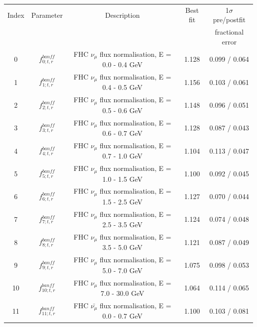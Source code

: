 {
\renewcommand{\arraystretch}{1.2}



\begin{table}
\centering
\begin{tabular}{| c | c | c | c | c |}
\hline
 Index & Parameter             & Description                                                & Best fit & 1$\sigma$ pre/postfit \\
       &                       &                                                            &          & fractional error \\
\hline

0      &$f_{0; t, r}^{banff}$  & FHC $\nu_\mu$ flux normalisation, E = 0.0 - 0.4 GeV         & 1.128   & 0.099 / 0.064 \\  
1      &$f_{1; t, r}^{banff}$  & FHC $\nu_\mu$ flux normalisation, E = 0.4 - 0.5 GeV         & 1.156   & 0.103 / 0.061 \\  
2      & $f_{2; t, r}^{banff}$ & FHC $\nu_\mu$ flux normalisation, E = 0.5 - 0.6 GeV         & 1.148   & 0.096 / 0.051 \\  
3      &$f_{3; t, r}^{banff}$  & FHC $\nu_\mu$ flux normalisation, E = 0.6 - 0.7 GeV         & 1.128   & 0.087 / 0.043 \\  
4      &$f_{4; t, r}^{banff}$  & FHC $\nu_\mu$ flux normalisation, E = 0.7 - 1.0 GeV         & 1.104   & 0.113 / 0.047 \\  
5      & $f_{5; t, r}^{banff}$ & FHC $\nu_\mu$ flux normalisation, E = 1.0 - 1.5 GeV         & 1.100   & 0.092 / 0.045 \\  
6      &$f_{6; t, r}^{banff}$  & FHC $\nu_\mu$ flux normalisation, E = 1.5 - 2.5 GeV         & 1.127   & 0.070 / 0.044 \\  
7      &$f_{7; t, r}^{banff}$  & FHC $\nu_\mu$ flux normalisation, E = 2.5 - 3.5 GeV         & 1.124   & 0.074 / 0.048 \\  
8      &$f_{8; t, r}^{banff}$  & FHC $\nu_\mu$ flux normalisation, E = 3.5 - 5.0 GeV         & 1.121   & 0.087 / 0.049 \\  
9      &$f_{9; t, r}^{banff}$  & FHC $\nu_\mu$ flux normalisation, E = 5.0 - 7.0 GeV         & 1.075   & 0.098 / 0.053 \\  
10     &$f_{10; t, r}^{banff}$ & FHC $\nu_\mu$ flux normalisation, E = 7.0 - 30.0 GeV        & 1.064   & 0.114 / 0.065 \\  
11     &$f_{11; t, r}^{banff}$ & FHC $\bar{\nu_\mu}$ flux normalisation, E = 0.0 - 0.7 GeV   & 1.100   & 0.103 / 0.081 \\  

\end{tabular}
\end{table}}
